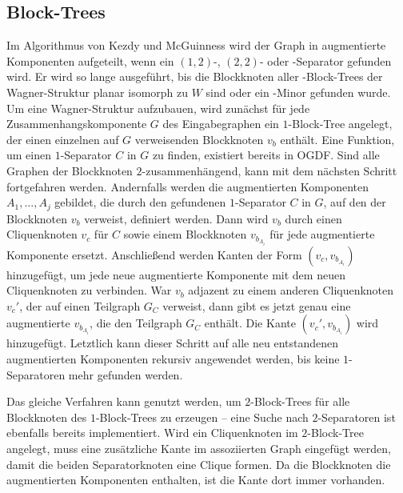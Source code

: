 \subsection{Block-Trees}
Im Algorithmus von Kezdy und McGuinness wird der Graph in augmentierte Komponenten aufgeteilt, wenn ein $(1, 2)$-, $(2, 2)$- oder \dd-Separator gefunden wird.
Er wird so lange ausgeführt, bis die Blockknoten aller \dd-Block-Trees der Wagner-Struktur planar \bzw isomorph zu $W$ sind oder ein \kf-Minor gefunden wurde.
Um eine Wagner-Struktur aufzubauen, wird zunächst für jede Zusammenhangskomponente $G$ des Eingabegraphen ein $1$-Block-Tree angelegt, der einen einzelnen auf $G$ verweisenden Blockknoten $v_b$ enthält.
Eine Funktion, um einen $1$-Separator $C$ in $G$ zu finden, existiert bereits in OGDF.
Sind alle Graphen der Blockknoten $2$-zusammenhängend, kann mit dem nächsten Schritt fortgefahren werden.
Andernfalls werden die augmentierten Komponenten $A_1, ..., A_j$ gebildet, die durch den gefundenen $1$-Separator $C$ in $G$, auf den der Blockknoten $v_b$ verweist, definiert werden.
Dann wird $v_b$ durch einen Cliquenknoten $v_c$ für $C$ sowie einem Blockknoten $v_{b_{A_i}}$ für jede augmentierte Komponente ersetzt.
Anschließend werden Kanten der Form $(v_c, v_{b_{A_i}})$ hinzugefügt, um jede neue augmentierte Komponente mit dem neuen Cliquenknoten zu verbinden.
War $v_b$ adjazent zu einem anderen Cliquenknoten $v_c'$, der auf einen Teilgraph $G_C$ verweist, dann gibt es jetzt genau eine augmentierte $v_{b_{A_i}}$, die den Teilgraph $G_C$ enthält.
Die Kante $(v_c', v_{b_{A_i}})$ wird hinzugefügt.
Letztlich kann dieser Schritt auf alle neu entstandenen augmentierten Komponenten rekursiv angewendet werden, bis keine $1$-Separatoren mehr gefunden werden.

Das gleiche Verfahren kann genutzt werden, um $2$-Block-Trees für alle Blockknoten des $1$-Block-Trees zu erzeugen -- eine Suche nach $2$-Separatoren ist ebenfalls bereits implementiert.
Wird ein Cliquenknoten im $2$-Block-Tree angelegt, muss \ggf eine zusätzliche Kante im assoziierten Graph eingefügt werden, damit die beiden Separatorknoten eine Clique formen.
Da die Blockknoten die augmentierten Komponenten enthalten, ist die Kante dort immer vorhanden.

